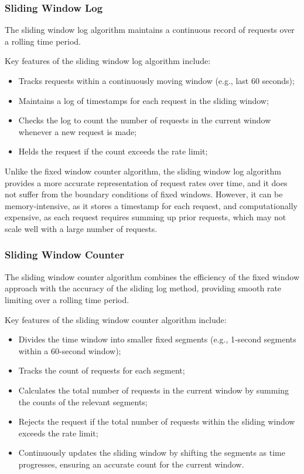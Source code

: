 \subsubsection{Sliding Window Log}\label{subsubsec:sliding-window-log-algorithm}

The sliding window log algorithm maintains a continuous record of requests over a rolling time period.

Key features of the sliding window log algorithm include:

\begin{itemize}
    \item Tracks requests within a continuously moving window (e.g., last 60 seconds);
    \item Maintains a log of timestamps for each request in the sliding window;
    \item Checks the log to count the number of requests in the current window whenever a new request is made;
    \item Helds the request if the count exceeds the rate limit;
\end{itemize}

Unlike the fixed window counter algorithm,
the sliding window log algorithm provides a more accurate representation of request rates over time,
and it does not suffer from the boundary conditions of fixed windows.
However, it can be memory-intensive, as it stores a timestamp for each request, and computationally expensive,
as each request requires summing up prior requests, which may not scale well with a large number of requests.

\subsubsection{Sliding Window Counter}\label{subsubsec:sliding-window-counter-algorithm}

The sliding window counter algorithm combines the efficiency of the fixed window approach with the accuracy of the sliding log method, providing smooth rate limiting over a rolling time period.

Key features of the sliding window counter algorithm include:

\begin{itemize}
    \item Divides the time window into smaller fixed segments (e.g., 1-second segments within a 60-second window);
    \item Tracks the count of requests for each segment;
    \item Calculates the total number of requests in the current window by summing the counts of the relevant segments;
    \item Rejects the request if the total number of requests within the sliding window exceeds the rate limit;
    \item Continuously updates the sliding window by shifting the segments as time progresses, ensuring an accurate count for the current window.
\end{itemize}

